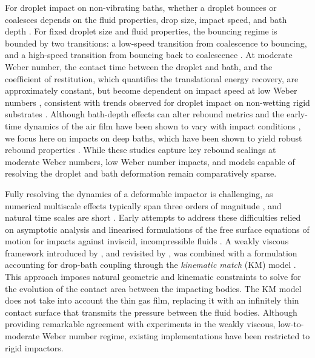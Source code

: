 \documentclass{jfm}
\begin{document}
For droplet impact on non-vibrating baths, whether a droplet bounces or coalesces depends on the fluid properties, drop size, impact speed, and bath depth \citep{CouderEtAl2005Noncoalescence,Yarin2006,kavehpour2015,tang2019bouncing}. For fixed droplet size and fluid properties, the bouncing regime is bounded by two transitions: a low-speed transition from coalescence to bouncing, and a high-speed transition from bouncing back to coalescence \citep{pan2007dynamics,zhao2011transition}. 
At moderate Weber number, the contact time between the droplet and bath, and the coefficient of restitution, which quantifies the translational energy recovery, are approximately constant, but become dependent on impact speed at low Weber numbers \citep{jayaratne1964coalescence,zhao2011transition,zou2011experimental,wu2020small,Sanjay_Chantelot_Lohse_2023}, consistent with trends observed for droplet impact on non-wetting rigid substrates \citep{GabbardEtAl2025}. Although bath-depth effects can alter rebound metrics \citep{pan2007dynamics,zou2011experimental} and the early-time dynamics of the air film have been shown to vary with impact conditions \citep{highspeed_thoroddsen_2008}, we focus here on impacts on deep baths, which have been shown to yield robust rebound properties \citep{AlventosaEtAl2023}. While these studies capture key rebound scalings at moderate Weber numbers, low Weber number impacts, and models capable of resolving the droplet and bath deformation remain comparatively sparse. 

Fully resolving the dynamics of a deformable impactor is challenging, as numerical multiscale effects typically span three orders of magnitude \citep{CouderEtAl2005Noncoalescence}, and natural time scales are short \citep[see figure 3b of][]{GaleanoRiosEtAl2017}. Early attempts to address these difficulties relied on asymptotic analysis and linearised formulations of the free surface equations of motion for impacts against inviscid, incompressible fluids \citep{Wagner1932, korobkin2004analytical,HowisonEtAl1991}. A weakly viscous framework introduced by \citet{Lamb}, and revisited by \citet{DiasEtAl2008}, was combined with a formulation accounting for drop-bath coupling through the \emph{kinematic match} (KM) model \citep{GaleanoRiosEtAl2017,Galeano-RiosEtAl2019,Galeano-RiosEtAl2021}. This approach imposes natural geometric and kinematic constraints to solve for the evolution of the contact area between the impacting bodies. The KM model does not take into account the thin gas film, replacing it with an infinitely thin contact surface that transmits the pressure between the fluid bodies. Although providing remarkable agreement with experiments in the weakly viscous, low-to-moderate Weber number regime, existing implementations have been restricted to rigid impactors. 
\end{document}

